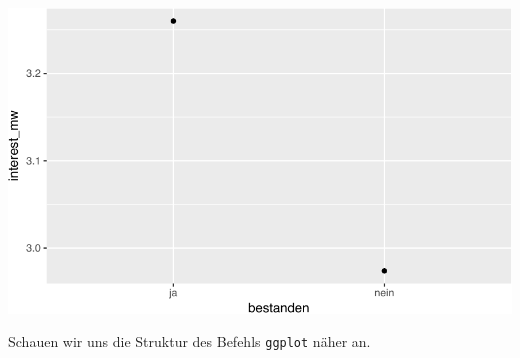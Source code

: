 \documentclass[12pt,]{book}
\newenvironment{Shaded}{\begin{snugshade}}{\end{snugshade}}
\newcommand{\KeywordTok}[1]{\textcolor[rgb]{0.13,0.29,0.53}{\textbf{{#1}}}}
\newcommand{\DataTypeTok}[1]{\textcolor[rgb]{0.13,0.29,0.53}{{#1}}}
\newcommand{\StringTok}[1]{\textcolor[rgb]{0.31,0.60,0.02}{{#1}}}
\newcommand{\NormalTok}[1]{{#1}}
\begin{document}
\begin{Shaded}
\end{Shaded}

\begin{center}\includegraphics[width=0.7\linewidth]{050_Daten_visualisieren_files/figure-latex/unnamed-chunk-23-1} \end{center}

Schauen wir uns die Struktur des Befehls \texttt{ggplot} näher an.
\end{document}
